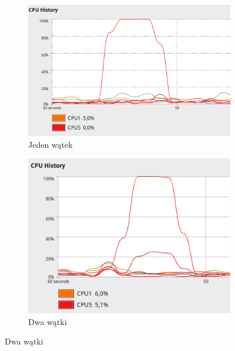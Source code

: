 \documentclass[10pt,a4paper]{article}
\begin{document}
\begin{figure}[H]
    \centering
    \begin{subfigure}[b]{0.4\textwidth}
        \includegraphics[width=\textwidth]{33-1.png}
        \caption{Jeden wątek}
        \label{fig:33-1}
    \end{subfigure}
    \begin{subfigure}[b]{0.4\textwidth}
        \includegraphics[width=\textwidth]{33-2.png}
        \caption{Dwa wątki}
        \label{fig:33-2}
    \end{subfigure}
    

\end{figure}
\end{document}
